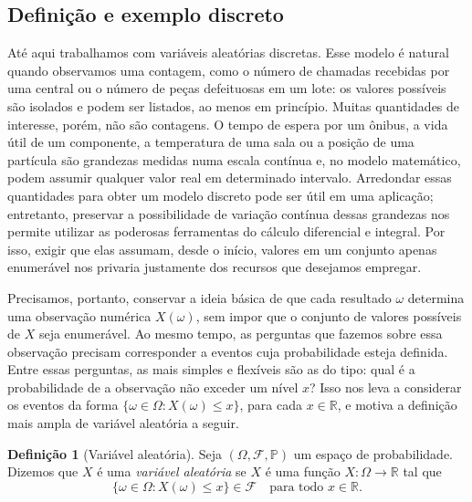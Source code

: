 \documentclass[12pt,portuguese]{article}
\theoremstyle{definition}
\newtheorem{definition}[definition]{Definição}
\theoremstyle{plainexercise}
\theoremstyle{starredexercise}
\theoremstyle{definition}
\begin{document}
\subsection{Definição e exemplo discreto}

Até aqui trabalhamos com variáveis aleatórias discretas. Esse modelo é natural
quando observamos uma contagem, como o número de chamadas recebidas por uma
central ou o número de peças defeituosas em um lote: os valores possíveis são
isolados e podem ser listados, ao menos em princípio. Muitas quantidades de
interesse, porém, não são contagens. O tempo de espera por um ônibus, a vida
útil de um componente, a temperatura de uma sala ou a posição de uma partícula
são grandezas medidas numa escala contínua e, no modelo matemático, podem
assumir qualquer valor real em determinado intervalo. Arredondar essas
quantidades para obter um modelo discreto pode ser útil em uma aplicação;
entretanto, preservar a possibilidade de variação contínua dessas grandezas nos
permite utilizar as poderosas ferramentas do cálculo diferencial e integral.
Por isso, exigir que elas assumam, desde o início, valores em um conjunto apenas enumerável
nos privaria justamente dos recursos que desejamos empregar.

\medskip
Precisamos, portanto, conservar a ideia básica de que cada resultado
$\omega$ determina uma observação numérica $X(\omega)$, sem impor que o
conjunto de valores possíveis de $X$ seja enumerável. Ao mesmo tempo, as
perguntas que fazemos sobre essa observação precisam corresponder a eventos
cuja probabilidade esteja definida. Entre essas perguntas, as mais simples e
flexíveis são as do tipo: qual é a probabilidade de a observação não exceder
um nível $x$? Isso nos leva a considerar os eventos da forma
$\{\omega\in\Omega:X(\omega)\leqslant x\}$, para cada $x\in\mathbb{R}$, e
motiva a definição mais ampla de variável aleatória a seguir.

\begin{definition}[Variável aleatória]
\label{def:variavel-aleatoria}
Seja $(\Omega,\mathcal{F},\mathbb{P})$ um espaço de probabilidade. Dizemos
que $X$ é uma \emph{variável aleatória} se $X$ é uma função
$X:\Omega\to\mathbb{R}$ tal que
\begin{equation}
\label{eq:variavel-aleatoria}
  \{\omega\in\Omega : X(\omega)\leqslant x\}\in\mathcal{F}
  \quad\text{para todo } x\in\mathbb{R}.
\end{equation}
\end{definition}
\end{document}
